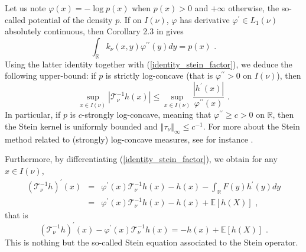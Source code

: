 \documentclass[11pt]{article}
\begin{document}
Let us note $\varphi \left( x\right) =-\log p\left( x\right) $ when $p\left(
x\right) >0$ and $+\infty $ otherwise, the so-called potential of the
density $p$. If on $I\left( \nu \right) $, $\varphi $ has derivative $%
\varphi ^{\prime }\in L_{1}\left( \nu \right) $ absolutely continuous, then
Corollary 2.3 in \cite{saumwellner2017efron} gives 
\begin{equation*}
\int_{\mathbb{R}}k_{\nu }\left( x,y\right) \varphi ^{\prime \prime
}(y)dy=p\left( x\right) \text{ .}
\end{equation*}%
Using the latter identity together with (\ref{identity_stein_factor}), we
deduce the following upper-bound: if $p$ is strictly log-concave (that is $%
\varphi ^{\prime \prime }>0$ on $I\left( \nu \right) $), then%
\begin{equation}
\sup_{x\in I\left( \nu \right) }\left\vert \mathcal{T}_{\nu }^{-1}h\left(
x\right) \right\vert \leq \sup_{x\in I\left( \nu \right) }\frac{\left\vert
h^{\prime }\left( x\right) \right\vert }{\varphi ^{\prime \prime }\left(
x\right) }\text{ .}  \label{ineq_stein_factor_log_con_pot}
\end{equation}%
In particular, if $p$ is $c$-strongly log-concave, meaning that $\varphi
^{\prime \prime }\geq c>0$ on $\mathbb{R}$, then the Stein kernel is
uniformly bounded and $\left\Vert \tau _{\nu }\right\Vert _{\infty }\leq
c^{-1}$. For more about the Stein method related to (strongly) log-concave
measures, see for instance \cite{MR3548768}.

Furthermore, by differentiating (\ref{identity_stein_factor}), we obtain for
any $x\in I\left( \nu \right) $,%
\begin{eqnarray*}
\left( \mathcal{T}_{\nu }^{-1}h\right) ^{\prime }\left( x\right) &=&\varphi
^{\prime }\left( x\right) \mathcal{T}_{\nu }^{-1}h\left( x\right) -h\left(
x\right) -\int_{\mathbb{R}}F\left( y\right) h^{\prime }\left( y\right) dy \\
&=&\varphi ^{\prime }\left( x\right) \mathcal{T}_{\nu }^{-1}h\left( x\right)
-h\left( x\right) +\mathbb{E}\left[ h\left( X\right) \right] \text{ ,}
\end{eqnarray*}%
that is%
\begin{equation*}
\left( \mathcal{T}_{\nu }^{-1}h\right) ^{\prime }\left( x\right) -\varphi
^{\prime }\left( x\right) \mathcal{T}_{\nu }^{-1}h\left( x\right) =-h\left(
x\right) +\mathbb{E}\left[ h\left( X\right) \right] \text{ .}
\end{equation*}%
This is nothing but the so-called Stein equation associated to the Stein
operator.
\end{document}
